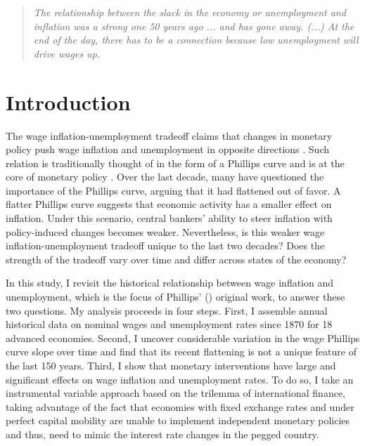 \documentclass[12pt]{article}
\begin{document}
\clearpage

\begin{quote}
\textit{The relationship between the slack in the economy or unemployment and inflation was a strong one 50 years ago ... and has gone away. (...) At the end of the day, there has to be a connection because low unemployment will drive wages up.} \cite{Powell2019}
\end{quote}


\section{Introduction}
The wage inflation-unemployment tradeoff claims that changes in monetary policy push wage inflation and unemployment in opposite directions \citep{Mankiw2001}. Such relation is traditionally thought of in the form of a Phillips curve and is at the core of monetary policy \citep{Barnichon2019, Eser2020}. Over the last decade, many have questioned the importance of the Phillips curve, arguing that it had flattened out of favor. A flatter Phillips curve suggests that economic activity has a smaller effect on inflation. Under this scenario, central bankers' ability to steer inflation with policy-induced changes becomes weaker. Nevertheless, is this weaker wage inflation-unemployment tradeoff unique to the last two decades? Does the strength of the tradeoff vary over time and differ across states of the economy?



In this study, I revisit the historical relationship between wage inflation and unemployment, which is the focus of Phillips' (\citeyear{Phillips1958}) original work, to answer these two questions. My analysis proceeds in four steps. First, I assemble annual historical data on nominal wages and unemployment rates since 1870 for 18 advanced economies. Second, I uncover considerable variation in the wage Phillips curve slope over time and find that its recent flattening is not a unique feature of the last 150 years. Third, I show that monetary interventions have large and significant effects on wage inflation and unemployment rates. To do so, I take an instrumental variable approach based on the trilemma of international finance, taking advantage of the fact that economies with fixed exchange rates and under perfect capital mobility are unable to implement independent monetary policies and thus, need to mimic the interest rate changes in the pegged country. 
\end{document}
